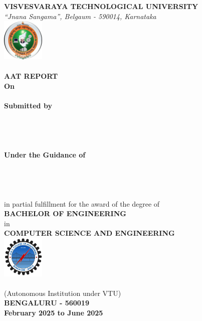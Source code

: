 \documentclass[a4paper,12pt]{report}
\begin{document}
\begin{titlepage}
    \centering
    \textbf{\large VISVESVARAYA TECHNOLOGICAL UNIVERSITY} \\
    \textit{“Jnana Sangama”, Belgaum - 590014, Karnataka} \\[0.5cm]

    \includegraphics[width=2cm]{../assets/vtu_logo.png} \\[0.5cm]

    \textbf{\large \course \\ AAT REPORT} \\[0.4cm]
    \textbf{On} \\[0.3cm]
    \textbf{\LARGE \projectname} \\[0.5cm]

    \textbf{Submitted by} \\[0.5cm]
    \textbf{\one } \\
    \textbf{\two } \\
    \textbf{\three } \\
    \textbf{\four } \\[0.5cm]

    \textbf{Under the Guidance of} \\[0.3cm]
    \textbf{\guidename} \\ 
    \textbf{\guidedesignation} \\
    \textbf{\guidedept} \\
    \textbf{\collegename}\\ [0.8cm]

    in partial fulfillment for the award of the degree of \\[0.3cm]
    \textbf{BACHELOR OF ENGINEERING} \\[0.3cm]
    in \\[0.3cm]
    \textbf{COMPUTER SCIENCE AND ENGINEERING} \\[0.5cm]

    \includegraphics[width=2cm]{../assets/college_logo.png} \\[0.5cm]

    \textbf{\large \collegename} \\
    (Autonomous Institution under VTU) \\[0.3cm]
    \textbf{BENGALURU - 560019} \\[0.3cm]
    \textbf{February 2025 to June 2025}

\end{titlepage}
\newpage
\end{document}
